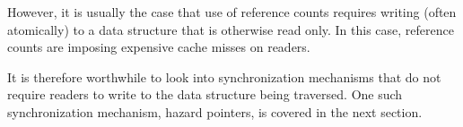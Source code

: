 
However, it is usually the case that use of reference counts requires
writing (often atomically) to a data structure that is otherwise
read only.
In this case, reference counts are imposing expensive cache misses
on readers.

It is therefore worthwhile to look into synchronization mechanisms
that do not require readers to write to the data structure being
traversed.
One such synchronization mechanism, hazard pointers, is covered in
the next section.
